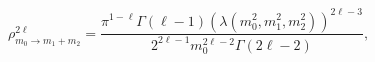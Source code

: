 \begin{equation}
 \rho^{2\ell}_{m_0\rightarrow m_1+m_2}=\frac{\pi^{1-\ell}\Gamma(\ell-1)
 (\lambda(m_0^2,m_1^2,m_2^2))^{2\ell-3}}
  {2^{2\ell-1}m_0^{2\ell-2}\Gamma(2\ell-2)},
\end{equation}

